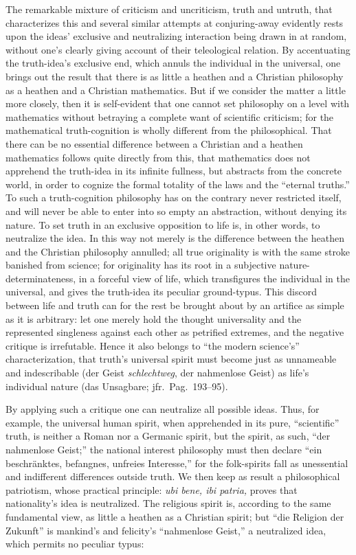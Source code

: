 \documentclass[12pt]{book}
\begin{document}
The remarkable mixture of criticism and uncriticism, truth and untruth, that
characterizes this and several similar attempts at conjuring-away evidently
rests upon the ideas' exclusive and neutralizing interaction being drawn in
at random, without one's clearly giving account of their teleological
relation. By accentuating the truth-idea's exclusive end, which annuls the
individual in the universal, one brings out the result that there is as
little a heathen and a Christian philosophy as a heathen and a Christian
mathematics. But if we consider the matter a little more closely, then it is
self-evident that one cannot set philosophy on a level with mathematics
without betraying a complete want of scientific criticism; for the
mathematical truth-cognition is wholly different from the philosophical.
That there can be no essential difference between a Christian and a heathen
mathematics follows quite directly from this, that mathematics does not
apprehend the truth-idea in its infinite fullness, but abstracts from the
concrete world, in order to cognize the formal totality of the laws and the
``eternal truths.'' To such a truth-cognition philosophy has on the contrary
never restricted itself, and will never be able to enter into so empty an
abstraction, without denying its nature. To set truth in an exclusive
opposition to life is, in other words, to neutralize the idea. In this way
not merely is the difference between the heathen and the Christian
philosophy annulled; all true originality is with the same stroke banished
from science; for originality has its root in a subjective
nature-determinateness, in a forceful view of life, which transfigures the
individual in the universal, and gives the truth-idea its peculiar
ground-typus. This discord between life and truth can for the rest be
brought about by an artifice as simple as it is arbitrary: let one merely
hold the thought universality and the represented singleness against each
other as petrified extremes, and the negative critique is irrefutable. Hence
it also belongs to ``the modern science's'' characterization, that truth's
universal spirit must become just as unnameable and indescribable (der Geist
\emph{schlechtweg}, der nahmenlose Geist) as life's individual nature (das
Unsagbare; jfr.\ Pag.\ 193--95).

By applying such a critique one can neutralize all possible ideas. Thus, for
example, the universal human spirit, when apprehended in its pure,
``scientific'' truth, is neither a Roman nor a Germanic spirit, but the
spirit, as such, ``der nahmenlose Geist;'' the national interest philosophy
must then declare ``ein beschränktes, befangnes, unfreies Interesse,'' for
the folk-spirits fall as unessential and indifferent differences outside
truth. We then keep as result a philosophical patriotism, whose practical
principle: \textit{ubi bene, ibi patria,} proves that nationality's idea is
neutralized. The religious spirit is, according to the same fundamental
view, as little a heathen as a Christian spirit; but ``die Religion der
Zukunft'' is mankind's and felicity's ``nahmenlose Geist,'' a neutralized
idea, which permits no peculiar typus:
\end{document}
